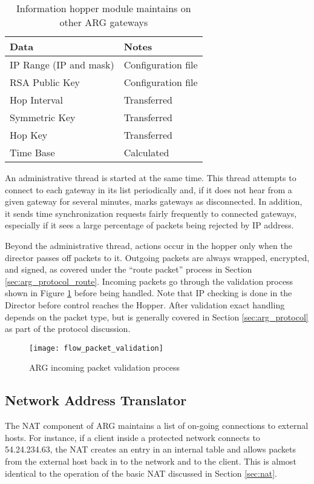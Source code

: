 \begin{table}
\caption{Information hopper module maintains on other \ac{ARG} gateways}
\label{tab:gatestate}
\centering
\begin{tabular}{l|l}
	\textbf{Data} & \textbf{Notes } \\
	\hline
	IP Range (IP and mask) & Configuration file \\
	\ac{RSA} Public Key & Configuration file \\
	Hop Interval & Transferred \\
	Symmetric Key & Transferred \\
	Hop Key & Transferred \\
	Time Base & Calculated \\
\end{tabular}
\end{table}

\par An administrative thread is started at the same time. This thread attempts to connect to each gateway in its list periodically and, if it does not hear from a given gateway for several minutes, marks gateways as disconnected. In addition, it sends time synchronization requests fairly frequently to connected gateways, especially if it sees a large percentage of packets being rejected by \ac{IP} address. 

\par Beyond the administrative thread, actions occur in the hopper only when the director passes off packets to it. Outgoing packets are always wrapped, encrypted, and signed, as covered under the ``route packet'' process in Section \ref{sec:arg_protocol_route}. Incoming packets go through the validation process shown in Figure \ref{fig:arg_hopper_in_validation} before being handled. Note that \ac{IP} checking is done in the Director before control reaches the Hopper. After validation exact handling depends on the packet type, but is generally covered in Section \ref{sec:arg_protocol} as part of the protocol discussion.

\begin{figure}
\caption{\ac{ARG} incoming packet validation process}
\label{fig:arg_hopper_in_validation}
\centering
\texttt{[image: flow\_packet\_validation]}
\end{figure}

\subsection{Network Address Translator}
\label{sec:arg_nat}
\par The \ac{NAT} component of \ac{ARG} maintains a list of on-going connections to external hosts. For instance, if a client inside a protected network connects to 54.24.234.63, the \ac{NAT} creates an entry in an internal table and allows packets from the external host back in to the network and to the client. This is almost identical to the operation of the basic \ac{NAT} discussed in Section \ref{sec:nat}.

